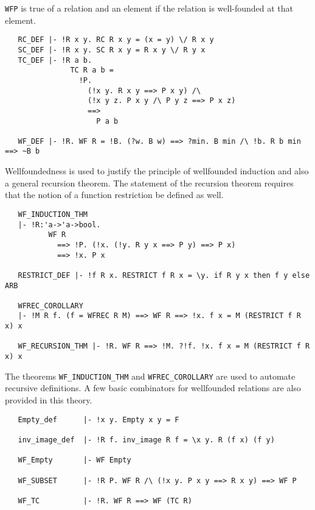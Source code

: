 {\small\verb!WFP! is true of a relation and an element if the relation
  is well-founded at that element.

\begin{hol} \begin{verbatim}
   RC_DEF |- !R x y. RC R x y = (x = y) \/ R x y
   SC_DEF |- !R x y. SC R x y = R x y \/ R y x
   TC_DEF |- !R a b.
               TC R a b =
                 !P.
                   (!x y. R x y ==> P x y) /\
                   (!x y z. P x y /\ P y z ==> P x z)
                   ==>
                     P a b

   WF_DEF |- !R. WF R = !B. (?w. B w) ==> ?min. B min /\ !b. R b min ==> ~B b
\end{verbatim}\end{hol}

Wellfoundedness is used to justify the principle of wellfounded
induction and also a general recursion theorem. The statement of the
recursion theorem requires that the notion of a function restriction be
defined as well.

\begin{hol} \begin{verbatim}
   WF_INDUCTION_THM
   |- !R:'a->'a->bool.
          WF R
            ==> !P. (!x. (!y. R y x ==> P y) ==> P x)
            ==> !x. P x

   RESTRICT_DEF |- !f R x. RESTRICT f R x = \y. if R y x then f y else ARB

   WFREC_COROLLARY
   |- !M R f. (f = WFREC R M) ==> WF R ==> !x. f x = M (RESTRICT f R x) x

   WF_RECURSION_THM |- !R. WF R ==> !M. ?!f. !x. f x = M (RESTRICT f R x) x
\end{verbatim}\end{hol}

\noindent The theorems {\small\verb+WF_INDUCTION_THM+} and
{\small\verb+WFREC_COROLLARY+} are used to automate recursive
definitions. A few basic combinators for wellfounded relations are also
provided in this theory.

\begin{hol} \begin{verbatim}
   Empty_def      |- !x y. Empty x y = F

   inv_image_def  |- !R f. inv_image R f = \x y. R (f x) (f y)

   WF_Empty       |- WF Empty

   WF_SUBSET      |- !R P. WF R /\ (!x y. P x y ==> R x y) ==> WF P

   WF_TC          |- !R. WF R ==> WF (TC R)


\end{verbatim}
\end{hol}}
